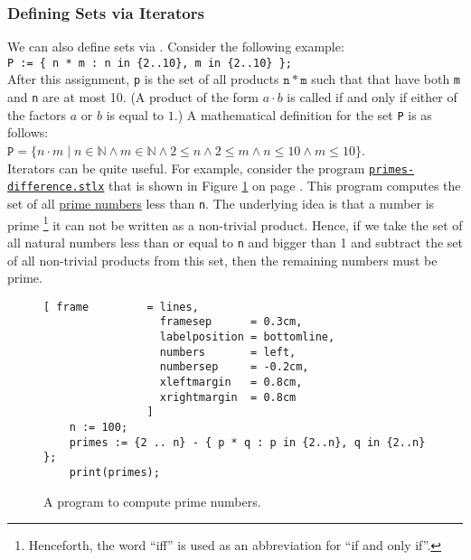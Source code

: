 \subsubsection{Defining Sets via Iterators}
We can also define sets via .  Consider the following example:
\\[0.2cm]
\hspace*{1.3cm} 
\texttt{P := \{ n * m : n in \{2..10\}, m in \{2..10\} \};} 
\\[0.2cm]
After this assignment,  \texttt{p} is the set of all  products $\mathtt{n} * \mathtt{m}$ such
that that have both \texttt{m} and \texttt{n} are at most 10.  
(A product of the form $a \cdot b$ is called  if and only if
either of the factors  $a$ or $b$ is equal to $1$.)
A mathematical definition for the set  \texttt{P} is as follows:
\\[0.2cm]
\hspace*{1.3cm} 
$\mathtt{P} = \bigl\{ n \cdot m \mid n \in \mathbb{N} \wedge m \in \mathbb{N} \wedge 
                                 2 \leq n \wedge 2 \leq m \wedge n \leq 10 \wedge m \leq 10 
              \bigl\}
$. 
\\[0.2cm]
Iterators can be quite useful.  For example, consider the program 
\href{https://github.com/karlstroetmann/Logik/blob/master/SetlX/primes-difference.stlx}{\texttt{primes-difference.stlx}}
that is shown in Figure \ref{fig:primes-sieve.stlx} on page \pageref{fig:primes-sieve.stlx}.
This program computes the set of all \href{https://en.wikipedia.org/wiki/Prime_number}{prime
  numbers} less than \texttt{n}.  The underlying idea is that 
a number is prime \footnote{
  Henceforth, the word ``iff'' is used as an abbreviation for ``if and only if''.
}  
it can not be written as a non-trivial product.  Hence, if we take the set of all natural numbers less than
or equal to \texttt{n} and bigger than 1 and subtract the set of all non-trivial products from this set, then the
remaining numbers must be prime.


\begin{figure}[!ht]
  \centering
\begin{Verbatim}[ frame         = lines, 
                  framesep      = 0.3cm, 
                  labelposition = bottomline,
                  numbers       = left,
                  numbersep     = -0.2cm,
                  xleftmargin   = 0.8cm,
                  xrightmargin  = 0.8cm
                ]
    n := 100;
    primes := {2 .. n} - { p * q : p in {2..n}, q in {2..n} };
    print(primes);
\end{Verbatim} 
\vspace*{-0.3cm}
\caption{A program to compute prime numbers.}
  \label{fig:primes-sieve.stlx}
\end{figure} 

